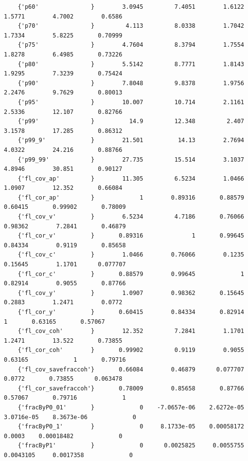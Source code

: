 \documentclass[
]{book}
\begin{document}
\begin{verbatim}
    {'p60'               }        3.0945         7.4051        1.6122        1.5771        4.7002        0.6586 
    {'p70'               }         4.113         8.0338        1.7042        1.7334        5.8225       0.70999 
    {'p75'               }        4.7604         8.3794        1.7554        1.8278        6.4985       0.73226 
    {'p80'               }        5.5142         8.7771        1.8143        1.9295        7.3239       0.75424 
    {'p90'               }        7.8048         9.8378        1.9756        2.2476        9.7629       0.80013 
    {'p95'               }        10.007         10.714        2.1161        2.5336        12.107       0.82766 
    {'p99'               }          14.9         12.348         2.407        3.1578        17.285       0.86312 
    {'p99_9'             }        21.501          14.13        2.7694        4.0322        24.216       0.88766 
    {'p99_99'            }        27.735         15.514        3.1037        4.8946        30.851       0.90127 
    {'fl_cov_ap'         }        11.305         6.5234        1.0466        1.0907        12.352       0.66084 
    {'fl_cor_ap'         }             1        0.89316       0.88579       0.60415       0.99902       0.78009 
    {'fl_cov_v'          }        6.5234         4.7186       0.76066       0.98362        7.2841       0.46879 
    {'fl_cor_v'          }       0.89316              1       0.99645       0.84334        0.9119       0.85658 
    {'fl_cov_c'          }        1.0466        0.76066        0.1235       0.15645        1.1701      0.077707 
    {'fl_cor_c'          }       0.88579        0.99645             1       0.82914        0.9055       0.87766 
    {'fl_cov_y'          }        1.0907        0.98362       0.15645        0.2883        1.2471        0.0772 
    {'fl_cor_y'          }       0.60415        0.84334       0.82914             1       0.63165       0.57067 
    {'fl_cov_coh'        }        12.352         7.2841        1.1701        1.2471        13.522       0.73855 
    {'fl_cor_coh'        }       0.99902         0.9119        0.9055       0.63165             1       0.79716 
    {'fl_cov_savefraccoh'}       0.66084        0.46879      0.077707        0.0772       0.73855      0.063478 
    {'fl_cor_savefraccoh'}       0.78009        0.85658       0.87766       0.57067       0.79716             1 
    {'fracByP0_01'       }             0    -7.0657e-06    2.6272e-05    3.0716e-05    8.3673e-06             0 
    {'fracByP0_1'        }             0     8.1733e-05    0.00058172        0.0003    0.00018482             0 
    {'fracByP1'          }             0      0.0025825     0.0055755     0.0043105     0.0017358             0 

\end{verbatim}
\end{document}
